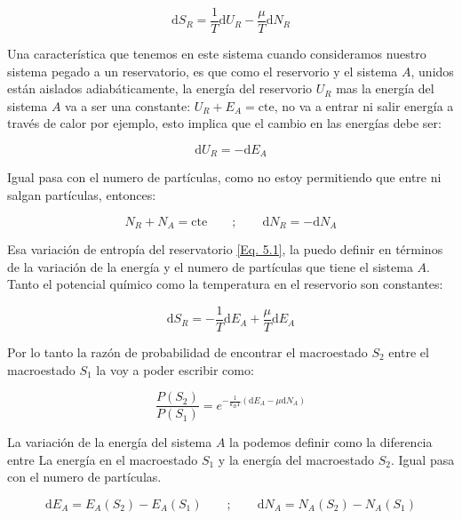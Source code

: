 \documentclass[11pt,fleqn]{book}
\begin{document}
\begin{equation}
    \mathrm{d}S_{R}=\frac{1}{T}\mathrm{d}U_{R}-\frac{\mu}{T}\mathrm{d}N_{R}
    \label{Eq. 5.1}
\end{equation}

Una característica que tenemos en este sistema cuando consideramos nuestro sistema pegado a un reservatorio, es que como el reservorio y el sistema $A$, unidos están aislados adiabáticamente, la energía del reservorio $U_{R}$ mas la energía del sistema $A$ va a ser una constante: $U_{R}+E_{A}=\text{cte}$, no va a entrar ni salir energía a través de calor por ejemplo, esto implica que el cambio en las energías debe ser:

\begin{equation*}
\mathrm{d}U_{R}=-\mathrm{d}E_{A}    
\end{equation*}

Igual pasa con el numero de partículas, como no estoy permitiendo que entre ni salgan partículas, entonces:

\begin{equation}
    N_{R}+N_{A}=\text{cte}\qquad;\qquad\mathrm{d}N_{R}=-\mathrm{d}N_{A}
    \label{Eq. 5.2}
\end{equation}

Esa variación de entropía del reservatorio \ref{Eq. 5.1}, la puedo definir en términos de la variación de la energía y el numero de partículas que tiene el sistema $A$. Tanto el potencial químico como la temperatura en el reservorio son constantes:

\begin{equation}
       \mathrm{d}S_{R}=-\frac{1}{T}\mathrm{d}E_{A}+\frac{\mu}{T}\mathrm{d}E_{A}
    \label{Eq. 5.3}
\end{equation}

Por lo tanto la  razón de probabilidad de encontrar el macroestado $S_{2}$ entre el macroestado $S_{1}$ la voy a poder escribir como:

\begin{equation}
    \frac{P(S_{2})}{P(S_{1})}=e^{-\frac{1}{k_{B}T}(\mathrm{d}E_{A}-\mu\mathrm{d}N_{A})}
    \label{Eq. 5.4}
\end{equation}

La variación de la energía del sistema $A$ la podemos definir como la diferencia entre La energía en el macroestado $S_{1}$ y la energía del macroestado $S_{2}$. Igual pasa con el numero de partículas.

\begin{equation*}
    \mathrm{d}E_{A}=E_{A}(S_{2})-E_{A}(S_{1})\qquad;\qquad\mathrm{d}N_{A}=N_{A}(S_{2})-N_{A}(S_{1})
\end{equation*}
\end{document}
